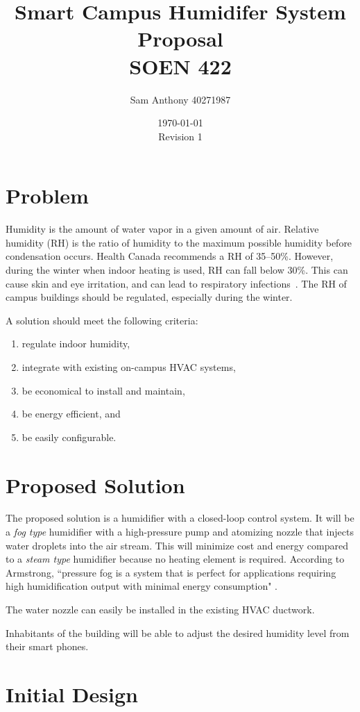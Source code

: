 \documentclass[11pt]{article}
\title{Smart Campus Humidifer System Proposal
\\ SOEN 422}
\author{Sam Anthony 40271987}
\date{\today\\Revision 1}
\begin{document}
\maketitle

\section{Problem}

Humidity is the amount of water vapor in a given amount of air.
Relative humidity (RH) is the ratio of humidity to the maximum possible humidity before condensation occurs.
Health Canada recommends a RH of 35--50\%.
However, during the winter when indoor heating is used, RH can fall below 30\%.
This can cause skin and eye irritation, and can lead to respiratory infections~\cite{healthcanada}.
The RH of campus buildings should be regulated, especially during the winter.

A solution should meet the following criteria:
\begin{enumerate}
	\item regulate indoor humidity,
	\item integrate with existing on-campus HVAC systems,
	\item be economical to install and maintain,
	\item be energy efficient, and
	\item be easily configurable.
\end{enumerate}

\section{Proposed Solution}

The proposed solution is a humidifier with a closed-loop control system.
It will be a \emph{fog type} humidifier with a high-pressure pump and atomizing nozzle that injects water droplets into the air stream.
This will minimize cost and energy compared to a \emph{steam type} humidifier because no heating element is required.
According to Armstrong, ``pressure fog is a system that is perfect for applications requiring high humidification output with minimal energy consumption" \cite{armstrong}.

The water nozzle can easily be installed in the existing HVAC ductwork.

Inhabitants of the building will be able to adjust the desired humidity level from their smart phones.

\section{Initial Design}
\end{document}

